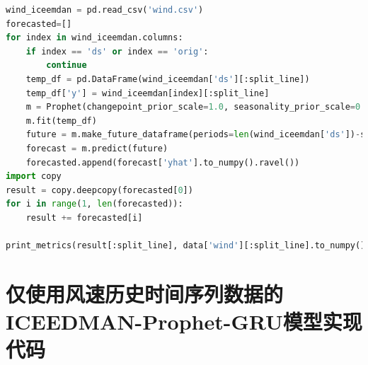 \documentclass[AutoFakeBold]{LZUThesis}
\begin{document}
\begin{lstlisting}[language = python]
wind_iceemdan = pd.read_csv('wind.csv')
forecasted=[]
for index in wind_iceemdan.columns:
    if index == 'ds' or index == 'orig':
        continue
    temp_df = pd.DataFrame(wind_iceemdan['ds'][:split_line])
    temp_df['y'] = wind_iceemdan[index][:split_line]
    m = Prophet(changepoint_prior_scale=1.0, seasonality_prior_scale=0.1, seasonality_mode='additive', changepoint_range=1, yearly_seasonality=True)
    m.fit(temp_df)
    future = m.make_future_dataframe(periods=len(wind_iceemdan['ds'])-split_line, freq='3H')
    forecast = m.predict(future)
    forecasted.append(forecast['yhat'].to_numpy().ravel())
import copy
result = copy.deepcopy(forecasted[0])
for i in range(1, len(forecasted)):
    result += forecasted[i]

print_metrics(result[:split_line], data['wind'][:split_line].to_numpy())
\end{lstlisting}

\section{仅使用风速历史时间序列数据的ICEEDMAN-Prophet-GRU模型实现代码}
\end{document}
